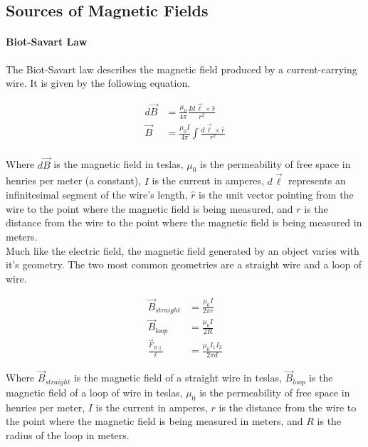 \subsection{Sources of Magnetic Fields}
\hrulefill

\paragraph*{Biot-Savart Law}
The Biot-Savart law describes the magnetic field produced by a current-carrying wire. It is given by the following equation.

\begin{align*}
    d\vec{B} &= \frac{\mu_0}{4\pi}\frac{Id\vec{\ell} \times \hat{r}}{r^2}\\
    \vec{B} &= \frac{\mu_0 I}{4\pi}\int \frac{d\vec{\ell} \times \hat{r}}{r^2}\\
\end{align*}

Where $d\vec{B}$ is the magnetic field in teslas, $\mu_0$ is the permeability of free space in henries per meter (a constant), 
$I$ is the current in amperes, $d\vec{\ell}$ represents an infinitesimal segment of the wire's length, $\hat{r}$ is the unit vector 
pointing from the wire to the point where the magnetic field is being measured, and $r$ is the distance from the wire to the point where 
the magnetic field is being measured in meters.\\

Much like the electric field, the magnetic field generated by an object varies with it's geometry. The two most common geometries are a straight 
wire and a loop of wire.

\begin{align*}
    \vec{B}_{straight} &= \frac{\mu_0 I}{2\pi r}\\
    \vec{B}_{loop} &= \frac{\mu_0 I}{2R}\\
    \frac{\vec{F}_{B\parallel}}{\ell} &= \frac{\mu_0 I_1 I_2}{2\pi d}
\end{align*}

Where $\vec{B}_{straight}$ is the magnetic field of a straight wire in teslas, $\vec{B}_{loop}$ is the magnetic field of a loop of wire in teslas,
$\mu_0$ is the permeability of free space in henries per meter, $I$ is the current in amperes, $r$ is the distance from the wire to the point where
the magnetic field is being measured in meters, and $R$ is the radius of the loop in meters.\\


